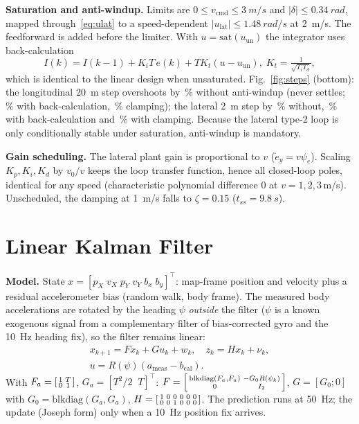 \documentclass[conference]{IEEEtran}
\begin{document}
\textbf{Saturation and anti-windup.} Limits are $0\le v_\mathrm{cmd}\le\SI{3}{m/s}$ and $|\delta|\le\SI{0.34}{rad}$, mapped through~\eqref{eq:ulat} to a speed-dependent $|u_\mathrm{lat}|\le\SI{1.48}{rad/s}$ at \SI{2}{m/s}. The feedforward is added before the limiter. With $u=\mathrm{sat}(u_\mathrm{un})$ the integrator uses back-calculation~\cite{astrom2006}
\begin{equation}
I(k)=I(k-1)+K_iT\,e(k)+T K_t(u-u_\mathrm{un}),\; K_t=\tfrac{1}{\sqrt{T_iT_d}},
\label{eq:aw}
\end{equation}
which is identical to the linear design when unsaturated. Fig.~\ref{fig:steps} (bottom): the longitudinal \SI{20}{m} step overshoots by \awLonNone\,\% without anti-windup (never settles; \awLonBC\,\% with back-calculation, \awLonCl\,\% clamping); the lateral \SI{2}{m} step by \awLatNone\,\% without, \awLatBC\,\% with back-calculation and \awLatCl\,\% with clamping. Because the lateral type-2 loop is only conditionally stable under saturation, anti-windup is mandatory.

\textbf{Gain scheduling.} The lateral plant gain is proportional to $v$ ($\dot e_y=v\psi_e$). Scaling $K_p,K_i,K_d$ by $v_0/v$ keeps the loop transfer function, hence all closed-loop poles, identical for any speed (characteristic polynomial difference $0$ at $v=1,2,3$\,m/s). Unscheduled, the damping at \SI{1}{m/s} falls to $\zeta=0.15$ ($t_{ss}=\SI{9.8}{s}$).

\section{Linear Kalman Filter}\label{sec:lkf}
\textbf{Model.} State $x=[p_X\;v_X\;p_Y\;v_Y\;b_x\;b_y]^\top$: map-frame position and velocity plus a residual accelerometer bias (random walk, body frame). The measured body accelerations are rotated by the heading $\psi$ \emph{outside} the filter ($\psi$ is a known exogenous signal from a complementary filter of bias-corrected gyro and the \SI{10}{Hz} heading fix), so the filter remains linear:
\begin{equation}
\begin{gathered}x_{k+1}=Fx_k+Gu_k+w_k,\quad z_k=Hx_k+\nu_k,\\ u=R(\psi)(a_\mathrm{meas}-b_\mathrm{cal}).\end{gathered}
\label{eq:kf}
\end{equation}
With $F_a=\begin{bsmallmatrix}1&T\\0&1\end{bsmallmatrix}$, $G_a=[T^2/2\;\;T]^\top$: $F=\begin{bsmallmatrix}\mathrm{blkdiag}(F_a,F_a)&-G_0R(\psi_k)\\0&I_2\end{bsmallmatrix}$, $G=[G_0;0]$ with $G_0=\mathrm{blkdiag}(G_a,G_a)$, $H=\begin{bsmallmatrix}1&0&0&0&0&0\\0&0&1&0&0&0\end{bsmallmatrix}$. The prediction runs at \SI{50}{Hz}; the update (Joseph form) only when a \SI{10}{Hz} position fix arrives.
\end{document}
